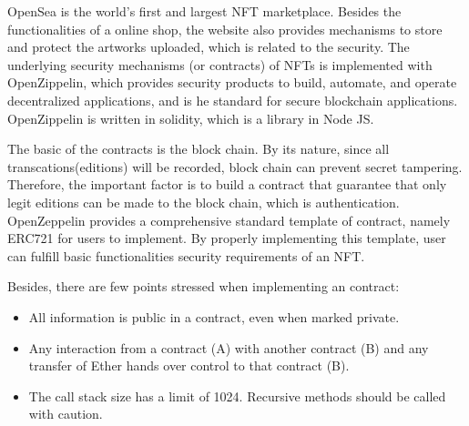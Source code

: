OpenSea is the world's first and largest NFT marketplace. Besides the functionalities of a online shop, the website also provides mechanisms to store and protect the artworks uploaded, which is related to the security. The underlying security mechanisms (or contracts) of NFTs is implemented with OpenZippelin, which provides security products to build, automate, and operate decentralized applications, and is he standard for secure blockchain applications. OpenZippelin is written in solidity, which is a library in Node JS.

The basic of the contracts is the block chain. By its nature, since all transcations(editions) will be recorded, block chain can prevent secret tampering. Therefore, the important factor is to build a contract that guarantee that only legit editions can be made to the block chain, which is authentication. OpenZeppelin provides a comprehensive standard template of contract, namely ERC721 for users to implement. By properly implementing this template, user can fulfill basic functionalities security requirements of an NFT.

Besides, there are few points stressed when implementing an contract:
\begin{itemize}
    \item All information is public in a contract, even when marked private.
    \item Any interaction from a contract (A) with another contract (B) and any transfer of Ether hands over control to that contract (B).
    \item The call stack size has a limit of 1024. Recursive methods should be called with caution.
\end{itemize}
